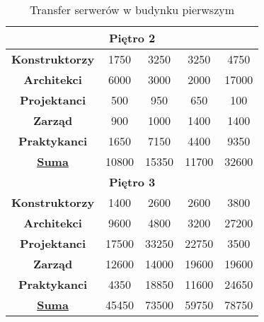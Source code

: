 \documentclass[a4paper, 12pt]{article}
\begin{document}
\begin{itemize}
\begin{table}[H]
{\begin{tabular}{c|c|c|c|c|}
\multicolumn{5}{|c|}{\textbf{Piętro 2}}                                                                                                                              \\ \hline
\multicolumn{1}{|c|}{\textbf{Konstruktorzy}} & 1750                         & 3250                       & 3250                         & 4750                       \\ \hline
\multicolumn{1}{|c|}{\textbf{Architekci}}    & 6000                         & 3000                       & 2000                         & 17000                      \\ \hline
\multicolumn{1}{|c|}{\textbf{Projektanci}}   & 500                          & 950                        & 650                          & 100                        \\ \hline
\multicolumn{1}{|c|}{\textbf{Zarząd}}        & 900                          & 1000                       & 1400                         & 1400                       \\ \hline
\multicolumn{1}{|c|}{\textbf{Praktykanci}}   & 1650                         & 7150                       & 4400                         & 9350                       \\ \hline
\multicolumn{1}{|c|}{{\ul \textbf{Suma}}}    & 10800                        & 15350                      & 11700                        & 32600                      \\ \hline
\multicolumn{5}{|c|}{\textbf{Piętro 3}}                                                                                                                              \\ \hline
\multicolumn{1}{|c|}{\textbf{Konstruktorzy}} & 1400                         & 2600                       & 2600                         & 3800                       \\ \hline
\multicolumn{1}{|c|}{\textbf{Architekci}}    & 9600                         & 4800                       & 3200                         & 27200                      \\ \hline
\multicolumn{1}{|c|}{\textbf{Projektanci}}   & 17500                        & 33250                      & 22750                        & 3500                       \\ \hline
\multicolumn{1}{|c|}{\textbf{Zarząd}}        & 12600                        & 14000                      & 19600                        & 19600                      \\ \hline
\multicolumn{1}{|c|}{\textbf{Praktykanci}}   & 4350                         & 18850                      & 11600                        & 24650                      \\ \hline
\multicolumn{1}{|c|}{{\ul \textbf{Suma}}}    & 45450                        & 73500                      & 59750                        & 78750                      \\ \hline
\end{tabular}}
\caption{Transfer serwerów w budynku pierwszym}
\end{table}


\end{itemize}
\end{document}
